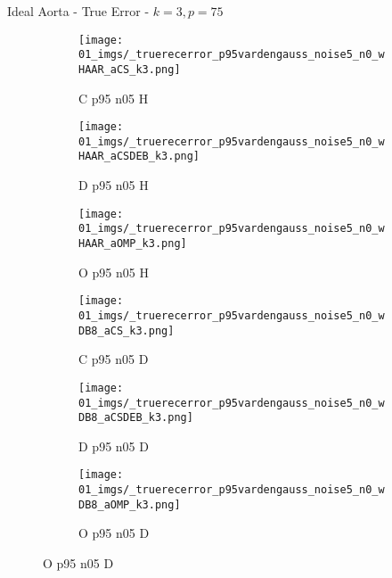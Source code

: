 \begin{frame}{Ideal Aorta - True Error - $k=3,p=75$}{}
\begin{figure}
\begin{subfigure}{0.13\textwidth}
\texttt{[image: 01\_imgs/\_truerecerror\_p95vardengauss\_noise5\_n0\_wHAAR\_aCS\_k3.png]}
\caption*{\tiny C p95 n05 H}
\end{subfigure}
\begin{subfigure}{0.13\textwidth}
\texttt{[image: 01\_imgs/\_truerecerror\_p95vardengauss\_noise5\_n0\_wHAAR\_aCSDEB\_k3.png]}
\caption*{\tiny D p95 n05 H}
\end{subfigure}
\begin{subfigure}{0.13\textwidth}
\texttt{[image: 01\_imgs/\_truerecerror\_p95vardengauss\_noise5\_n0\_wHAAR\_aOMP\_k3.png]}
\caption*{\tiny O p95 n05 H}
\end{subfigure}
\begin{subfigure}{0.13\textwidth}
\texttt{[image: 01\_imgs/\_truerecerror\_p95vardengauss\_noise5\_n0\_wDB8\_aCS\_k3.png]}
\caption*{\tiny C p95 n05 D}
\end{subfigure}
\begin{subfigure}{0.13\textwidth}
\texttt{[image: 01\_imgs/\_truerecerror\_p95vardengauss\_noise5\_n0\_wDB8\_aCSDEB\_k3.png]}
\caption*{\tiny D p95 n05 D}
\end{subfigure}
\begin{subfigure}{0.13\textwidth}
\texttt{[image: 01\_imgs/\_truerecerror\_p95vardengauss\_noise5\_n0\_wDB8\_aOMP\_k3.png]}
\caption*{\tiny O p95 n05 D}
\end{subfigure}

\vspace{5pt}


\end{figure}
\end{frame}
